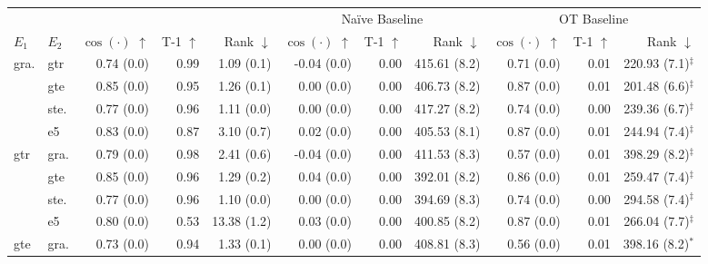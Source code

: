 \begin{table}[!ht]
    \scriptsize
    \centering
    \begin{tabular}{llrrrrrrrrr}
        \toprule
        \multicolumn{2}{c}{} & \multicolumn{3}{c}{\atk{}} & \multicolumn{3}{c}{Naïve Baseline} & \multicolumn{3}{c}{OT Baseline}\\
        \cmidrule(lr){3-5} \cmidrule(lr){6-8}  \cmidrule(lr){9-11} 
        $E_1$ & $E_2$ & $\cos(\cdot)$ $\uparrow$ & T-1 $\uparrow$ & Rank $\downarrow$ & $\cos(\cdot)$ $\uparrow$ & T-1 $\uparrow$ & Rank $\downarrow$ &  $\cos(\cdot)$ $\uparrow$ & T-1 $\uparrow$ & Rank $\downarrow$\\
        \midrule
        \multirow{4}{*}{gra.} & gtr & 0.74 {\tiny (0.0)} & 0.99 & 1.09 {\tiny (0.1)} & -0.04 {\tiny (0.0)} & 0.00 & 415.61 {\tiny (8.2)} & 0.71 {\tiny (0.0)} & 0.01 & 220.93 {\tiny (7.1)}$^{\ddagger}$ \\
        & gte & 0.85 {\tiny (0.0)} & 0.95 & 1.26 {\tiny (0.1)} & 0.00 {\tiny (0.0)} & 0.00 & 406.73 {\tiny (8.2)} & 0.87 {\tiny (0.0)} & 0.01 & 201.48 {\tiny (6.6)}$^{\ddagger}$ \\
        & ste. & 0.77 {\tiny (0.0)} & 0.96 & 1.11 {\tiny (0.0)} & 0.00 {\tiny (0.0)} & 0.00 & 417.27 {\tiny (8.2)} & 0.74 {\tiny (0.0)} & 0.00 & 239.36 {\tiny (6.7)}$^{\ddagger}$ \\
        & e5 & 0.83 {\tiny (0.0)} & 0.87 & 3.10 {\tiny (0.7)} & 0.02 {\tiny (0.0)} & 0.00 & 405.53 {\tiny (8.1)} & 0.87 {\tiny (0.0)} & 0.01 & 244.94 {\tiny (7.4)}$^{\ddagger}$ \\
        \midrule
        \multirow{4}{*}{gtr} & gra. & 0.79 {\tiny (0.0)} & 0.98 & 2.41 {\tiny (0.6)} & -0.04 {\tiny (0.0)} & 0.00 & 411.53 {\tiny (8.3)} & 0.57 {\tiny (0.0)} & 0.01 & 398.29 {\tiny (8.2)}$^\ddagger$ \\
        & gte & 0.85 {\tiny (0.0)} & 0.96 & 1.29 {\tiny (0.2)} & 0.04 {\tiny (0.0)} & 0.00 & 392.01 {\tiny (8.2)} & 0.86 {\tiny (0.0)} & 0.01 & 259.47 {\tiny (7.4)}$^{\ddagger}$ \\
        & ste. & 0.77 {\tiny (0.0)} & 0.96 & 1.10 {\tiny (0.0)} & 0.00 {\tiny (0.0)} & 0.00 & 394.69 {\tiny (8.3)} & 0.74 {\tiny (0.0)} & 0.00 & 294.58 {\tiny (7.4)}$^{\ddagger}$ \\
        & e5 & 0.80 {\tiny (0.0)} & 0.53 & 13.38 {\tiny (1.2)} & 0.03 {\tiny (0.0)} & 0.00 & 400.85 {\tiny (8.2)} & 0.87 {\tiny (0.0)} & 0.01 & 266.04 {\tiny (7.7)}$^{\ddagger}$ \\
        \midrule
        \multirow{4}{*}{gte} & gra. & 0.73 {\tiny (0.0)} & 0.94 & 1.33 {\tiny (0.1)} & 0.00 {\tiny (0.0)} & 0.00 & 408.81 {\tiny (8.3)} & 0.56 {\tiny (0.0)} & 0.01 & 398.16 {\tiny (8.2)}$^*$ \\

\end{tabular}
\end{table}
